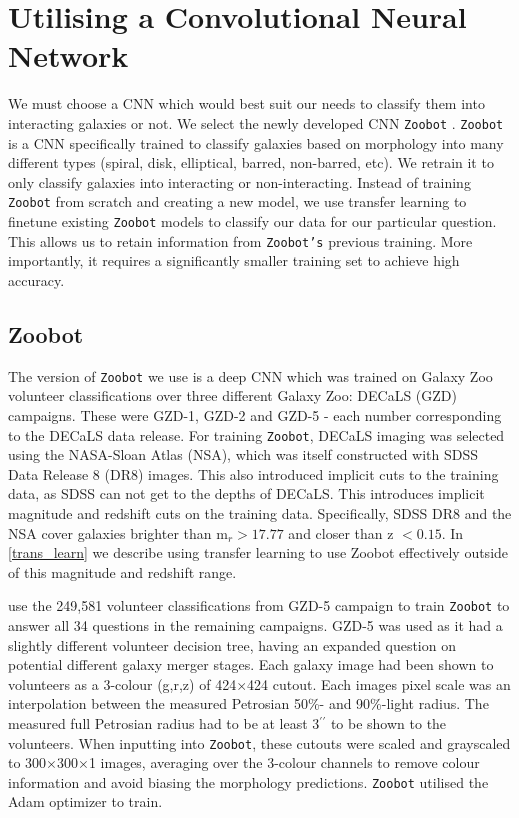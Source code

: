 \section{Utilising a Convolutional Neural Network}\label{CNNs}
\noindent We must choose a CNN which would best suit our needs to classify them into interacting galaxies or not. We select the newly developed CNN \texttt{Zoobot} \citep{2022MNRAS.509.3966W, 2023JOSS....8.5312W}. \texttt{Zoobot} is a CNN specifically trained to classify galaxies based on morphology into many different types (spiral, disk, elliptical, barred, non-barred, etc). We retrain it to only classify galaxies into interacting or non-interacting. Instead of training \texttt{Zoobot} from scratch and creating a new model, we use transfer learning to finetune existing \texttt{Zoobot} models to classify our data for our particular question. This allows us to retain information from \texttt{Zoobot's} previous training. More importantly, it requires a significantly smaller training set to achieve high accuracy.

\subsection{Zoobot}
\noindent The version of \texttt{Zoobot} we use is a deep CNN which was trained on Galaxy Zoo volunteer classifications over three different Galaxy Zoo: DECaLS (GZD)\citep[Dark Energy Camera Legacy Survey, described in][]{2019AJ....157..168D} campaigns. These were GZD-1, GZD-2 and GZD-5 - each number corresponding to the DECaLS data release. For training \texttt{Zoobot}, DECaLS imaging was selected using the NASA-Sloan Atlas (NSA), which was itself constructed with SDSS Data Release 8 (DR8) images. This also introduced implicit cuts to the training data, as SDSS can not get to the depths of DECaLS. This introduces implicit magnitude and redshift cuts on the training data. Specifically, SDSS DR8 and the NSA cover galaxies brighter than m$_r > 17.77$ and closer than z $< 0.15$. In \DIFdelbegin {}\DIFdelend \DIFaddbegin {}\DIFaddend \ref{trans_learn} we describe using transfer learning to use Zoobot effectively outside of this magnitude and redshift range.

\citet{2022MNRAS.509.3966W} use the 249,581 volunteer classifications from GZD-5 campaign to train \texttt{Zoobot} to answer all 34 questions \citep[example shown in Figure 4 of][]{2022MNRAS.509.3966W} in the remaining campaigns. GZD-5 was used as it had a slightly different volunteer decision tree, having an expanded question on potential different galaxy merger stages. Each galaxy image had been shown to volunteers as a 3-colour (g,r,z) of 424$\times$424 cutout. Each images pixel scale was an interpolation between the measured Petrosian 50\%- and 90\%-light radius. The measured full Petrosian radius had to be at least 3$^{\prime\prime}$ to be shown to the volunteers. When inputting into \texttt{Zoobot}, these cutouts were scaled and grayscaled to 300$\times$300$\times$1 images, averaging over the 3-colour channels to remove colour information and avoid biasing the morphology predictions. \texttt{Zoobot} utilised the Adam \citep{2014arXiv1412.6980K} optimizer to train.

